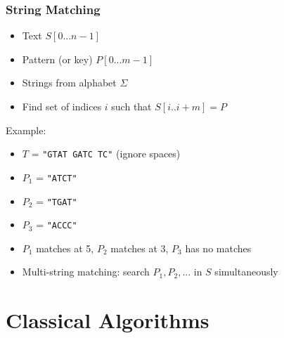 \documentclass[
	11pt, %
]{beamer}
\begin{document}


\begin{frame}
    \frametitle{String Matching}
    \begin{itemize}
        \item Text $S[0...n-1]$
        \item Pattern (or key) $P[0...m-1]$
        \item Strings from alphabet $\Sigma$
        \item Find set of indices $i$ such that $S[i..i+m] = P$
    \end{itemize}
    Example:
    \begin{itemize}
        \item $T$ = \texttt{"GTAT GATC TC"} (ignore spaces)
        \item $P_1$ = \texttt{"ATCT"}
        \item $P_2$ = \texttt{"TGAT"}
        \item $P_3$ = \texttt{"ACCC"}
        \item $P_1$ matches at 5, $P_2$ matches at 3, $P_3$ has no matches
    \end{itemize}
    \bigskip
    \begin{itemize}
        \item Multi-string matching: search $P_1, P_2, ...$ in $S$ simultaneously
    \end{itemize}
\end{frame}


\section{Classical Algorithms}
\end{document}
